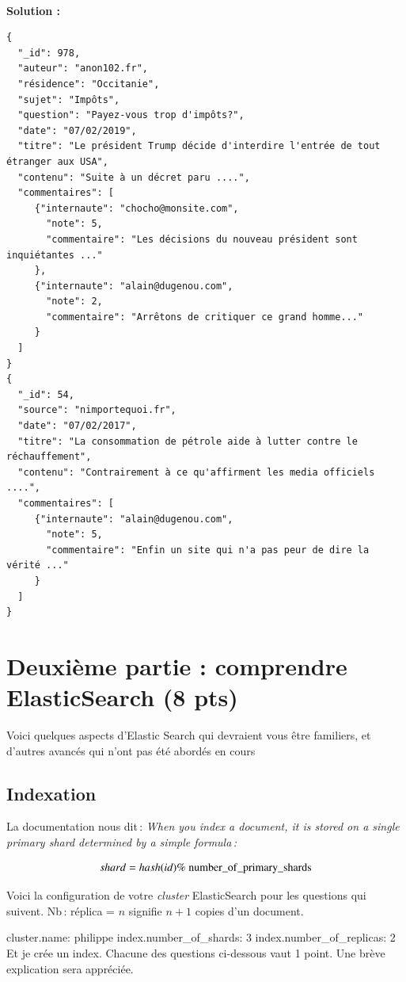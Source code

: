 \documentclass[11pt,a4paper]{article}
\newenvironment{smallverbatim}%
{\endgraf\small\verbatim}{\endverbatim}
\newenvironment{solution}[0]{
~\\ \color{red} \textbf{Solution : }\color{black}}{%
}
\begin{document}
\begin{solution}

\begin{verbatim}
{
  "_id": 978,
  "auteur": "anon102.fr",
  "résidence": "Occitanie",
  "sujet": "Impôts",
  "question": "Payez-vous trop d'impôts?",
  "date": "07/02/2019",
  "titre": "Le président Trump décide d'interdire l'entrée de tout étranger aux USA",
  "contenu": "Suite à un décret paru ....",
  "commentaires": [
     {"internaute": "chocho@monsite.com",
       "note": 5,
       "commentaire": "Les décisions du nouveau président sont inquiétantes ..."
     },
     {"internaute": "alain@dugenou.com",
       "note": 2,
       "commentaire": "Arrêtons de critiquer ce grand homme..."
     }
  ]
}
{
  "_id": 54,
  "source": "nimportequoi.fr",
  "date": "07/02/2017",
  "titre": "La consommation de pétrole aide à lutter contre le réchauffement",
  "contenu": "Contrairement à ce qu'affirment les media officiels ....",
  "commentaires": [
     {"internaute": "alain@dugenou.com",
       "note": 5,
       "commentaire": "Enfin un site qui n'a pas peur de dire la vérité ..."
     }
  ]
}
\end{verbatim}
\end{solution}


\section*{Deuxième partie : comprendre ElasticSearch (8 pts)}

Voici quelques aspects d'Elastic Search qui devraient vous être familiers, 
et d'autres avancés qui n'ont pas été abordés en cours

\subsection*{Indexation}

La documentation nous dit\,:
\textit{When you index a document, it is stored on a single primary shard determined by a simple formula\,:}

    $$shard = hash(id) \%\ \rm{number\_of\_primary\_shards}$$
    
Voici la configuration de votre \textit{cluster} ElasticSearch pour les questions qui suivent.
Nb\,: réplica = $n$ signifie $n+1$ copies d'un document.

\begin{smallverbatim}
cluster.name: philippe
index.number_of_shards: 3
index.number_of_replicas: 2
\end{smallverbatim} 
Et je crée un index. Chacune des questions ci-dessous vaut 1 point. Une brève explication sera appréciée.
\end{document}
